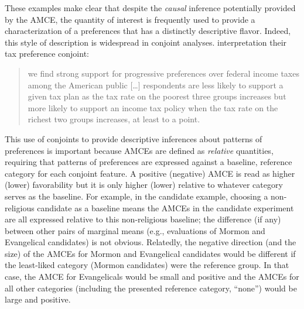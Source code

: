 \documentclass[a4paper,12pt]{article}\usepackage[]{graphicx}\usepackage[]{color}
\begin{document}
\noindent These examples make clear that despite the \textit{causal} inference potentially provided by the AMCE, the quantity of interest is frequently used to provide a characterization of a preferences that has a distinctly descriptive flavor. Indeed, this style of description is widespread in conjoint analyses. \citet{BallardRosaMartinScheve2016} interpretation their tax preference conjoint:

\begin{quote}
we find strong support for progressive preferences over federal income taxes among the American public [\dots] respondents are less likely to support a given tax plan as the tax rate on the poorest three groups increases but more likely to support an income tax policy when the tax rate on the richest two groups increases, at least to a point.
\end{quote}

\noindent This use of conjoints to provide descriptive inferences about patterns of preferences is important because AMCEs are defined as \textit{relative} quantities, requiring that patterns of preferences are expressed against a baseline, reference category for each conjoint feature. A positive (negative) AMCE is read as higher (lower) favorability but it is only higher (lower) relative to whatever category serves as the baseline. For example, in the \citeauthor{HainmuellerHopkinsYamamoto2014} candidate example, choosing a non-religious candidate as a baseline means the AMCEs in the candidate experiment are all expressed relative to this non-religious baseline; the difference (if any) between other pairs of marginal means (e.g., evaluations of Mormon and Evangelical candidates) is not obvious. Relatedly, the negative direction (and the size) of the AMCEs for Mormon and Evangelical candidates would be different if the least-liked category (Mormon candidates) were the reference group. In that case, the AMCE for Evangelicals would be small and positive and the AMCEs for all other categories (including the presented reference category, ``none'') would be large and positive.
\end{document}
